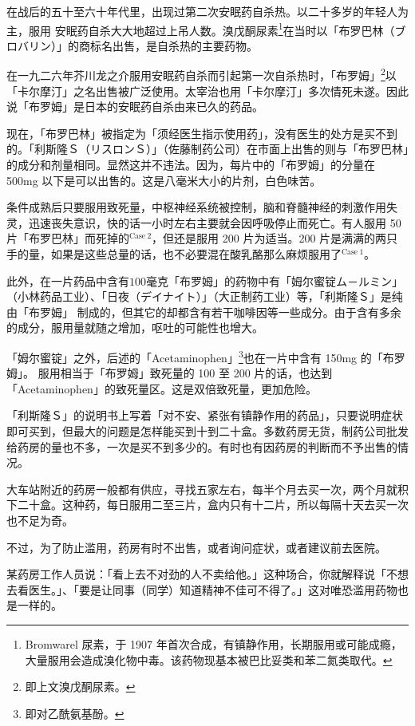 \documentclass[UTF8]{ctexart}
\begin{document}
在战后的五十至六十年代里，出现过第二次安眠药自杀热。以二十多岁的年轻人为主，服用
安眠药自杀大大地超过上吊人数。溴戊酮尿素\footnote{Bromwarel 尿素，于 1907 年首次合成，有镇静作用，长期服用或可能成瘾，大量服用会造成溴化物中毒。该药物现基本被巴比妥类和苯二氮类取代。}在当时以「布罗巴林（ブロバリン）」的商标名出售，是自杀热的主要药物。

在一九二六年芥川龙之介服用安眠药自杀而引起第一次自杀热时，「布罗姆」\footnote{即上文溴戊酮尿素。}以「卡尔摩汀」之名出售被广泛使用。太宰治也用「卡尔摩汀」多次情死未遂。因此说「布罗姆」是日本的安眠药自杀由来已久的药品。

现在，「布罗巴林」被指定为「须经医生指示使用药」，没有医生的处方是买不到的。「利斯隆Ｓ（リスロンＳ）」（佐藤制药公司）在市面上出售的则与「布罗巴林」的成分和剂量相同。显然这并不违法。因为，每片中的「布罗姆」的分量在 500mg 以下是可以出售的。这是八毫米大小的片剂，白色味苦。

条件成熟后只要服用致死量，中枢神经系统被控制，脑和脊髓神经的刺激作用失灵，迅速丧失意识，快的话一小时左右主要就会因呼吸停止而死亡。有人服用 50 片「布罗巴林」而死掉的$^{\mathrm{Case\ 2}}$，但还是服用 200 片为适当。200 片是满满的两只手的量，如果是这些总量的话，也不必要混在酸乳酪那么麻烦服用了$^{\mathrm{Case\ 1}}$。

此外，在一片药品中含有$100$毫克「布罗姆」的药物中有「姆尔蜜锭ム－ルミン」（小林药品工业）、「日夜（デイナイト）」（大正制药工业）等，「利斯隆Ｓ」是纯由「布罗姆」 制成的，但其它的却都含有若干咖啡因等一些成分。由于含有多余的成分，服用量就随之增加，呕吐的可能性也增大。

「姆尔蜜锭」之外，后述的「Acetaminophen」\footnote{即对乙酰氨基酚。}也在一片中含有 150mg 的「布罗姆」。 服用相当于「布罗姆」致死量的 100 至 200 片的话，也达到「Acetaminophen」的致死量区。这是双倍致死量，更加危险。

「利斯隆Ｓ」的说明书上写着「对不安、紧张有镇静作用的药品」，只要说明症状即可买到，但最大的问题是怎样能买到十到二十盒。多数药房无货，制药公司批发给药房的量也不多，一次是买不到多少的。有时也有因药房的判断而不予出售的情况。

大车站附近的药房一般都有供应，寻找五家左右，每半个月去买一次，两个月就积下二十盒。这种药，每日服用二至三片，盒内只有十二片，所以每隔十天去买一次也不足为奇。

不过，为了防止滥用，药房有时不出售，或者询问症状，或者建议前去医院。

某药房工作人员说：「看上去不对劲的人不卖给他。」这种场合，你就解释说「不想去看医生。」、「要是让同事（同学）知道精神不佳可不得了。」这对唯恐滥用药物也是一样的。
\end{document}
